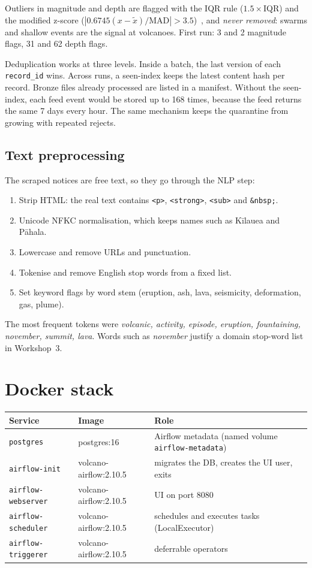\documentclass[11pt,a4paper]{article}
\begin{document}
Outliers in magnitude and depth are flagged with the IQR rule ($1.5\times$IQR) and the modified z-score ($|0.6745(x-\tilde{x})/\mathrm{MAD}|>3.5$)~\cite{iglewicz}, and \emph{never removed}: swarms and shallow events are the signal at volcanoes. First run: 3 and 2 magnitude flags, 31 and 62 depth flags.

Deduplication works at three levels. Inside a batch, the last version of each \texttt{record\_id} wins. Across runs, a seen-index keeps the latest content hash per record. Bronze files already processed are listed in a manifest. Without the seen-index, each feed event would be stored up to 168 times, because the feed returns the same 7 days every hour. The same mechanism keeps the quarantine from growing with repeated rejects.

\subsection{Text preprocessing}
The scraped notices are free text, so they go through the NLP step:
\begin{enumerate}
  \item Strip HTML: the real text contains \texttt{<p>}, \texttt{<strong>}, \texttt{<sub>} and \texttt{\&nbsp;}.
  \item Unicode NFKC normalisation, which keeps names such as Kīlauea and Pāhala.
  \item Lowercase and remove URLs and punctuation.
  \item Tokenise and remove English stop words from a fixed list.
  \item Set keyword flags by word stem (eruption, ash, lava, seismicity, deformation, gas, plume).
\end{enumerate}
The most frequent tokens were \emph{volcanic, activity, episode, eruption, fountaining, november, summit, lava}. Words such as \emph{november} justify a domain stop-word list in Workshop~3.

\section{Docker stack}

\begin{tabular}{lll}
\toprule
\textbf{Service} & \textbf{Image} & \textbf{Role}\\
\midrule
\texttt{postgres} & postgres:16 & Airflow metadata (named volume \texttt{airflow-metadata})\\
\texttt{airflow-init} & volcano-airflow:2.10.5 & migrates the DB, creates the UI user, exits\\
\texttt{airflow-webserver} & volcano-airflow:2.10.5 & UI on port 8080\\
\texttt{airflow-scheduler} & volcano-airflow:2.10.5 & schedules and executes tasks (LocalExecutor)\\
\texttt{airflow-triggerer} & volcano-airflow:2.10.5 & deferrable operators\\
\bottomrule
\end{tabular}
\end{document}
